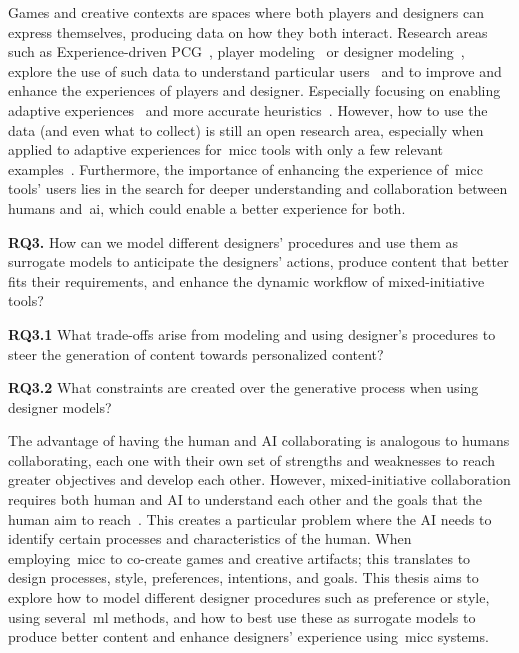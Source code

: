 Games and creative contexts are spaces where both players and designers can express themselves, producing data on how they both interact. Research areas such as Experience-driven PCG~\cite{yannakakis_experience-driven_2011}, player modeling~\cite{pedersen_modeling_2010,holmgard_automated_2019} or designer modeling~\cite{liapis_designer_2013}, explore the use of such data to understand particular users~\cite{liapis_designer_2013,drachen_player_2009,melhart_your_2019} and to improve and enhance the experiences of players and designer. Especially focusing on enabling adaptive experiences~\cite{hastings_evolving_2009} and more accurate heuristics~\cite{marino_empirical_2015,canossa_towards_2015,summerville_understanding_2017}. However, how to use the data (and even what to collect) is still an open research area, especially when applied to adaptive experiences for~\acrshort{micc} tools with only a few relevant examples~\cite{liapis_designer_2014,liapis_adapting_2012,halina_threshold_2022}. Furthermore, the importance of enhancing the experience of~\acrshort{micc} tools' users lies in the search for deeper understanding and collaboration between humans and~\acrshort{ai}, which could enable a better experience for both.

\begin{retQuestion}{}
   \textbf{RQ3.} How can we model different designers' procedures and use them as surrogate models to anticipate the designers' actions, produce content that better fits their requirements, and enhance the dynamic workflow of mixed-initiative tools?
   
    \begin{retQuestion}{}
        \textbf{RQ3.1} What trade-offs arise from modeling and using designer's procedures to steer the generation of content towards personalized content?
    \end{retQuestion}
   
   \begin{retQuestion}{}
        \textbf{RQ3.2} What constraints are created over the generative process when using designer models?
    \end{retQuestion}
   
\end{retQuestion}

The advantage of having the human and AI collaborating is analogous to humans collaborating, each one with their own set of strengths and weaknesses to reach greater objectives and develop each other. However, mixed-initiative collaboration requires both human and AI to understand each other and the goals that the human aim to reach~\cite{horvitz_principles_1999,novick_what_1997}. This creates a particular problem where the AI needs to identify certain processes and characteristics of the human. When employing~\acrshort{micc} to co-create games and creative artifacts; this translates to design processes, style, preferences, intentions, and goals. This thesis aims to explore how to model different designer procedures such as preference or style, using several~\acrlong{ml} methods, and how to best use these as surrogate models to produce better content and enhance designers' experience using~\acrshort{micc} systems.

